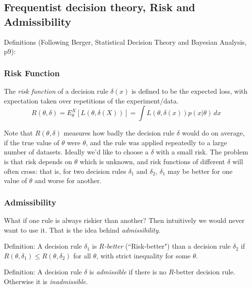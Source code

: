 \documentclass[12pt]{article}
\begin{document}
\subsection{Frequentist decision theory, Risk and Admissibility}

Definitions (Following Berger, Statistical Decision Theory and Bayesian Analysis, p9):

\subsubsection{Risk Function}

The {\it risk function} of a decision rule $\delta(x)$ is defined to be the expected loss, with expectation taken over repetitions of the experiment/data.
\begin{equation}
R(\theta,\delta) = E_\theta^X[L(\theta,\delta(X))] = \int L(\theta,\delta(x)) p(x|\theta) \, dx 
\end{equation}

Note that $R(\theta,\delta)$ measures how badly the decision rule $\delta$ would do on average, if the true value of $\theta$ were $\theta$, and the rule
was applied repeatedly to a large number of datasets.
Ideally we'd like to choose a $\delta$ with a small risk. The problem is
that risk depends on $\theta$ which is unknown, and risk functions of different $\delta$ will often cross: that is, for two decision rules $\delta_1$ and $\delta_2$, $\delta_1$ may be better for one value of
$\theta$ and worse for another.

\subsubsection{Admissibility}

What if one rule is always riskier than another? Then intuitively we would
never want to use it. That is the idea behind {\it admissibility}.

\medskip
Definition:  A decision rule $\delta_1$ is {\it $R$-better} (``Risk-better") than
a decision rule $\delta_2$ if $R(\theta,\delta_1) \leq R(\theta,\delta_2)$ for all $\theta$, with strict inequality for some $\theta$.

\medskip
Definition: A decision rule $\delta$ is {\it admissible} if there is no $R$-better decision rule. Otherwise it is {\it inadmissible}.
\end{document}
